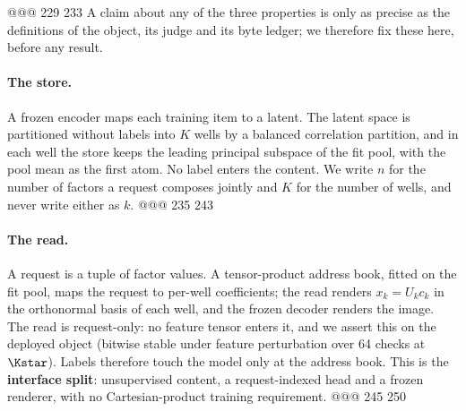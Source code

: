 @@@ 229 233
A claim about any of the three properties is only as precise as the definitions of the object,
its judge and its byte ledger; we therefore fix these here, before any result.

\paragraph{The store.} A frozen encoder maps each training item to a latent. The latent
space is partitioned without labels into $K$ wells by a balanced correlation partition, and in
each well the store keeps the leading principal subspace of the fit pool, with the pool mean as
the first atom. No label enters the content. We write $n$ for the number of factors a request
composes jointly and $K$ for the number of wells, and never write either as $k$.
@@@ 235 243
\paragraph{The read.} A request is a tuple of factor values. A tensor-product address book,
fitted on the fit pool, maps the request to per-well coefficients; the read renders
$x_k=U_k c_k$ in the orthonormal basis of each well, and the frozen decoder renders the image.
The read is request-only: no feature tensor enters it, and we assert this on the deployed object
(bitwise stable under feature perturbation over 64 checks at $\Kstar$).
Labels therefore touch the model only at the address book. This is the \textbf{interface
split}: unsupervised content, a request-indexed head and a frozen renderer, with no
Cartesian-product training requirement.
@@@ 245 250
